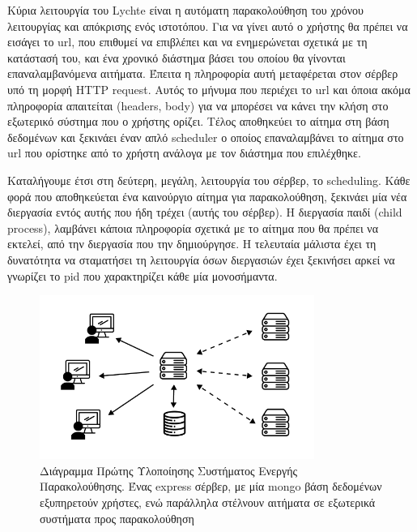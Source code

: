 Κύρια λειτουργία του Lychte είναι η αυτόματη παρακολούθηση του χρόνου λειτουργίας και απόκρισης ενός ιστοτόπου.
Για να γίνει αυτό ο χρήστης θα πρέπει να εισάγει το url, που επιθυμεί να επιβλέπει και να ενημερώνεται σχετικά με
τη κατάστασή του, και ένα χρονικό διάστημα βάσει του οποίου θα γίνονται επαναλαμβανόμενα αιτήματα.
Έπειτα η πληροφορία αυτή μεταφέρεται στον σέρβερ υπό τη μορφή HTTP request. Αυτός το μήνυμα που περιέχει το url και
όποια ακόμα πληροφορία απαιτείται (headers, body) για να μπορέσει να κάνει την κλήση στο εξωτερικό σύστημα
που ο χρήστης ορίζει. Τέλος αποθηκεύει το αίτημα στη βάση δεδομένων και ξεκινάει έναν απλό scheduler
ο οποίος επαναλαμβάνει το αίτημα στο url που ορίστηκε από το χρήστη ανάλογα με τον διάστημα
που επιλέχθηκε.

Καταλήγουμε έτσι στη δεύτερη, μεγάλη, λειτουργία του σέρβερ, το scheduling. Κάθε φορά που αποθηκεύεται ένα καινούργιο
αίτημα για παρακολούθηση, ξεκινάει μία νέα διεργασία εντός αυτής που ήδη τρέχει (αυτής του σέρβερ). Η διεργασία παιδί (child process),
λαμβάνει κάποια πληροφορία σχετικά με το αίτημα που θα πρέπει να εκτελεί, από την διεργασία που την δημιούργησε. Η τελευταία μάλιστα
έχει τη δυνατότητα να σταματήσει τη λειτουργία όσων διεργασιών έχει ξεκινήσει αρκεί να γνωρίζει το pid που χαρακτηρίζει κάθε μία μονοσήμαντα.

\begin{figure}[!ht]
	\centering
	\includegraphics[width=0.8\textwidth]{./images/chapter4/lychte-first-implementation.png}
	\caption[Διάγραμμα πρώτης Υλοποίησης]{Διάγραμμα Πρώτης Υλοποίησης Συστήματος Ενεργής Παρακολούθησης. Ένας express σέρβερ, με μία mongo βάση δεδομένων εξυπηρετούν χρήστες, ενώ παράλληλα στέλνουν αιτήματα σε εξωτερικά συστήματα προς παρακολούθηση}
	\label{fig:first_implementation}
\end{figure}

